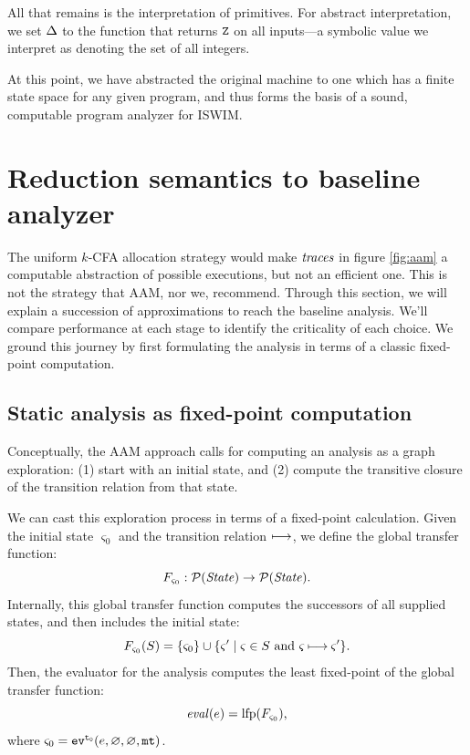 \documentclass[preprint,onecolumn,9pt]{sigplanconf} %
\begin{document}
All that remains is the interpretation of primitives.  For abstract
interpretation, we set $\interpdelta$ to the function that returns
$\sNum$ on all inputs---a symbolic value we interpret as denoting the
set of all integers.

At this point, we have abstracted the original machine to one which
has a finite state space for any given program, and thus forms the
basis of a sound, computable program analyzer for ISWIM.

\section{Reduction semantics to baseline analyzer}
\label{sec:baseline}

The uniform $k$-CFA allocation strategy would make $\traces$ in figure
\ref{fig:aam} a computable abstraction of possible executions, but not an
efficient one. This is not the strategy that AAM, nor we, recommend. Through
this section, we will explain a succession of approximations
to reach the baseline analysis.  We'll compare performance at each stage to
identify the criticality of each choice. 
%
We ground this journey by first formulating the analysis in terms of a classic
fixed-point computation.


\subsection{Static analysis as fixed-point computation}
\label{sec:fixpoint}

Conceptually, the AAM approach calls for computing an analysis as a graph
exploration: (1) start with an initial state, and (2) compute the transitive
closure of the transition relation from that state.

We can cast this exploration process in terms of a fixed-point calculation.
%
Given the initial state $\varsigma_0$ and the transition relation $\machstep$,
we define the global transfer function:
\begin{equation*}
 F_{\varsigma_0} : \mathcal{P}(\State) \to \mathcal{P}(\State)
 \text.
\end{equation*}
Internally, this global transfer function computes the successors of all supplied states, and then includes the initial state:
\begin{equation*}
  F_{\varsigma_0}(S) = \{ \varsigma_0 \} \cup \{ \varsigma' \mathrel{|} \varsigma \in S \text{ and } \varsigma \machstep \varsigma' \}\text. 
\end{equation*}
Then, the evaluator for the analysis computes the least fixed-point of the global transfer function:
\begin{equation*}
 \eval(e) = \mathrm{lfp}(F_{\varsigma_0})\text{,}
\end{equation*}
where $\varsigma_0 = \ev[^\mtcntr]{e, \varnothing, \varnothing, \kmt}$.
\end{document}
